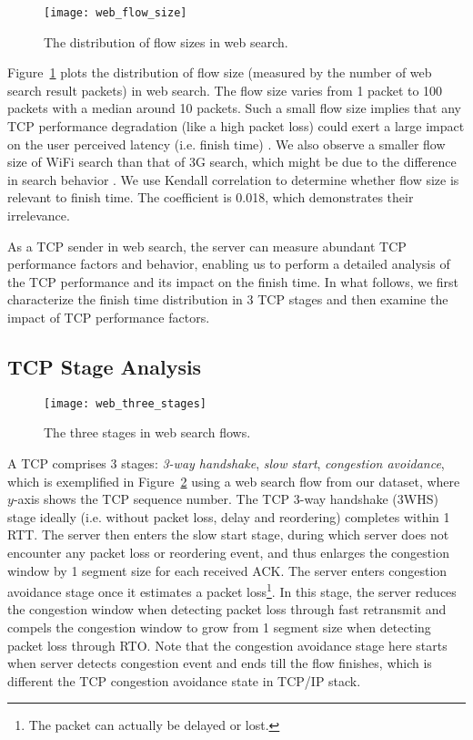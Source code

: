 \begin{figure}[th]
\centering
	\texttt{[image: web\_flow\_size]}
\caption{The distribution of flow sizes in web search.}
\label{fig:web_flow_size}
\end{figure}

Figure~\ref{fig:web_flow_size} plots the distribution of flow size (measured by the number of web search result packets) in web search. The flow size varies from 1 packet to 100 packets with a median around 10 packets. Such a small flow size implies that any TCP performance degradation (like a high packet loss) could exert a large impact on the user perceived latency (i.e. finish time) \cite{flach2013reducing}. We also observe a smaller flow size of WiFi search than that of 3G search, which might be due to the difference in search behavior \cite{Song:2013:EEU:2488388.2488493}. We use Kendall correlation to determine whether flow size is relevant to finish time. The coefficient is 0.018, which demonstrates their irrelevance.

As a TCP sender in web search, the server can measure abundant TCP performance factors and behavior, enabling us to perform a detailed analysis of the TCP performance and its impact on the finish time. In what follows, we first characterize the finish time distribution in 3 TCP stages and then examine the impact of TCP performance factors.

\subsection{TCP Stage Analysis}

\begin{figure}[th]
\centering
\texttt{[image: web\_three\_stages]}
\caption{The three stages in web search flows.}
\label{fig:web_three_stages}
\end{figure}

A TCP comprises 3 stages: \emph{3-way handshake}, \emph{slow start}, \emph{congestion avoidance}, which is exemplified in Figure~\ref{fig:web_three_stages} using a web search flow from our dataset, where $y$-axis shows the TCP sequence number. The TCP 3-way handshake (3WHS) stage ideally (i.e. without packet loss, delay and reordering) completes within 1 RTT. The server then enters the slow start stage, during which server does not encounter any packet loss or reordering event, and thus enlarges the congestion window by 1 segment size for each received ACK. The server enters congestion avoidance stage once it estimates a packet loss\footnote{The packet can actually be delayed or lost.}. In this stage, the server reduces the congestion window when detecting packet loss through fast retransmit\cite{jacobson1988congestion} and compels the congestion window to grow from 1 segment size when detecting packet loss through RTO. Note that the congestion avoidance stage here starts when server detects congestion event and ends till the flow finishes, which is different the TCP congestion avoidance state in TCP/IP stack.

